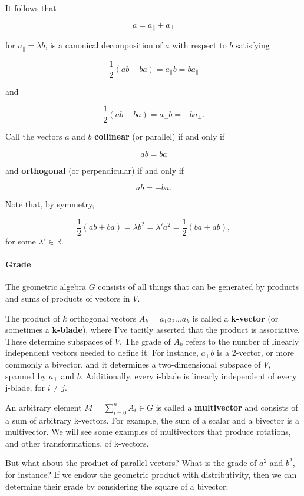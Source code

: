 \documentclass{article}
\begin{document}
It follows that

$$a = a_\parallel + a_\perp$$

for $a_\parallel = \lambda b$, is a canonical decomposition of $a$
with respect to $b$ satisfying

$$\frac{1}{2} (ab + ba) = a_\parallel b = b a_\parallel$$

and

$$\frac{1}{2} (ab - ba) = a_\perp b = -b a_\perp.$$

Call the vectors $a$ and $b$ \textbf{collinear} (or parallel) if and
only if

$$ab = ba$$

and \textbf{orthogonal} (or perpendicular) if and only if

$$ab = -ba.$$

Note that, by symmetry,

$$\frac{1}{2}(ab + ba) = \lambda b^2 = \lambda' a^2 = \frac{1}{2}(ba + ab),$$ for some $\lambda' \in \mathbb{R}$.

\paragraph{Grade}\label{grade}

The geometric algebra $G$ consists of all things that can be generated
by products and sums of products of vectors in $V$.

The product of $k$ orthogonal vectors $A_k = a_1 a_2 ... a_k$ is
called a \textbf{k-vector} (or sometimes a \textbf{k-blade}), where I've
tacitly asserted that the product is associative. These determine
subspaces of $V$. The grade of $A_k$ refers to the number of
linearly independent vectors needed to define it. For instance,
$a_\perp b$ is a 2-vector, or more commonly a bivector, and it
determines a two-dimensional subspace of $V$, spanned by $a_\perp$
and $b$. Additionally, every i-blade is linearly independent of every
j-blade, for $i\not=j$.

An arbitrary element $M = \sum_{i=0}^{n} A_i \in G$ is called a
\textbf{multivector} and consists of a sum of arbitrary k-vectors. For
example, the sum of a scalar and a bivector is a multivector. We will
see some examples of multivectors that produce rotations, and other
transformations, of k-vectors.

But what about the product of parallel vectors? What is the grade of
$a^2$ and $b^2$, for instance? If we endow the geometric product
with distributivity, then we can determine their grade by considering
the square of a bivector:
\end{document}
